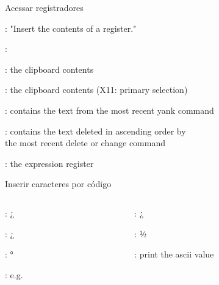 \begin{frame}{Acessar registradores}
    \begin{widedescription}
        \item {}: "Insert the contents of a register."
        \item {}:
        \begin{description}
            \item \key{+}:	the clipboard contents
            \item \key{*}:	the clipboard contents (X11: primary selection)
            \item {}: contains the text from the most recent yank command
            \item {}: contains the text deleted in ascending order by \\ the most recent delete or change command
            \item \key{=}: the expression register
        \end{description}
    \end{widedescription}
\end{frame}

\begin{frame}{Inserir caracteres por código}
    \begin{columns}
        \begin{column}{0.6\textwidth}
            \begin{widedescription}
                \item {}: ¿
                \item {}: ¿
                \item {}: °
                \item {}: e.g. 
            \end{widedescription}
        \end{column}
        
        \begin{column}{0.42\textwidth}
            \begin{widedescription}
                \item {}
                \item {}: ¿
                \item {}: ½
                \item {}: print the ascii value
            \end{widedescription}
        \end{column}
    \end{columns}
\end{frame}

